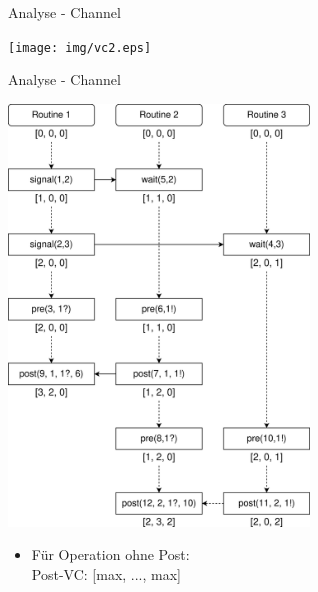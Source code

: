 \documentclass[aspectratio=169]{beamer}  %
\begin{document}
\begin{frame}{Analyse - Channel}
  \begin{minipage}{0.49\textwidth}
  \centering
  \texttt{[image: img/vc2.eps]}
  \end{minipage}
\end{frame}


\begin{frame}{Analyse - Channel}
  \begin{minipage}{0.49\textwidth}
  \centering
  \includegraphics[width=0.6\textwidth]{img/vc.eps}
  \end{minipage}
  \hfill
  \hfill
  \begin{minipage}{0.49\textwidth}
    \begin{itemize}
      \item<3> Für Operation ohne Post:\\Post-VC: [max, ..., max]
    \end{itemize}
  \end{minipage}
\end{frame}
\end{document}
